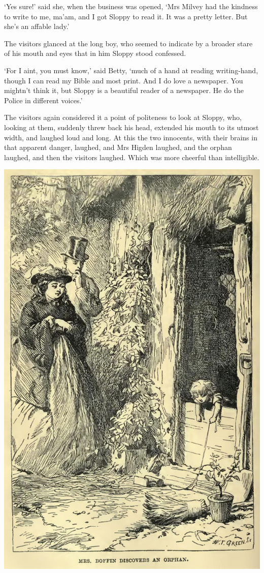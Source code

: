 ‘Yes sure!’ said she, when the business was opened, ‘Mrs Milvey had the
kindness to write to me, ma’am, and I got Sloppy to read it. It was a
pretty letter. But she’s an affable lady.’

The visitors glanced at the long boy, who seemed to indicate by a
broader stare of his mouth and eyes that in him Sloppy stood confessed.

‘For I aint, you must know,’ said Betty, ‘much of a hand at reading
writing-hand, though I can read my Bible and most print. And I do love a
newspaper. You mightn’t think it, but Sloppy is a beautiful reader of a
newspaper. He do the Police in different voices.’

The visitors again considered it a point of politeness to look at
Sloppy, who, looking at them, suddenly threw back his head, extended his
mouth to its utmost width, and laughed loud and long. At this the two
innocents, with their brains in that apparent danger, laughed, and Mrs
Higden laughed, and the orphan laughed, and then the visitors laughed.
Which was more cheerful than intelligible.

\includegraphics[scale=2.3]{01-16-01}

